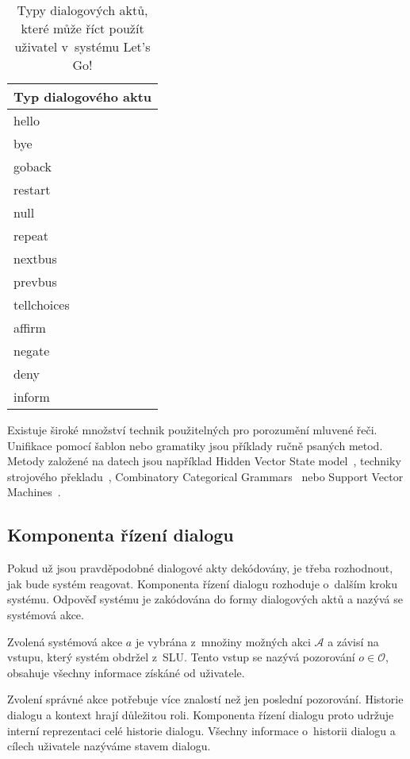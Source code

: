 \begin{table}[b!]
\begin{center}
\begin{tabular}{|l|}
\hline
Typ dialogového aktu \\
\hline
\hline
hello \\
\hline
bye \\
\hline
goback \\
\hline
restart \\
\hline
null \\
\hline
repeat \\
\hline
nextbus \\
\hline
prevbus \\
\hline
tellchoices \\
\hline
affirm \\
\hline
negate \\
\hline
deny \\
\hline
inform \\
\hline
\end{tabular}
\caption{Typy dialogových aktů, které může říct použít uživatel v~systému Let's Go!}
\label{tab:dstcdat}
\end{center}
\end{table}

Existuje široké množství technik použitelných pro porozumění mluvené řeči.
Unifikace pomocí šablon nebo gramatiky jsou příklady ručně psaných metod.
Metody založené na datech jsou například Hidden Vector State model~\cite{he2005semantic}, techniky strojového překladu~\cite{wong2007learning}, Combinatory Categorical Grammars~\cite{zettlemoyer2007online} nebo Support Vector Machines~\cite{mairesse2009spoken}.

\subsection{Komponenta řízení dialogu}

Pokud už jsou pravděpodobné dialogové akty dekódovány, je třeba rozhodnout, jak bude systém reagovat.
Komponenta řízení dialogu rozhoduje o~dalším kroku systému.
Odpověď systému je zakódována do formy dialogových aktů a nazývá se systémová akce.

Zvolená systémová akce $a$ je vybrána z~množiny možných akci $\mathcal{A}$ a závisí na vstupu, který systém obdržel z~SLU.
Tento vstup se nazývá pozorování $o \in \mathcal{O}$, obsahuje všechny informace získáné od uživatele.

Zvolení správné akce potřebuje více znalostí než jen poslední pozorování.
Historie dialogu a kontext hrají důležitou roli.
Komponenta řízení dialogu proto udržuje interní reprezentaci celé historie dialogu.
Všechny informace o~historii dialogu a cílech uživatele nazýváme stavem dialogu.

